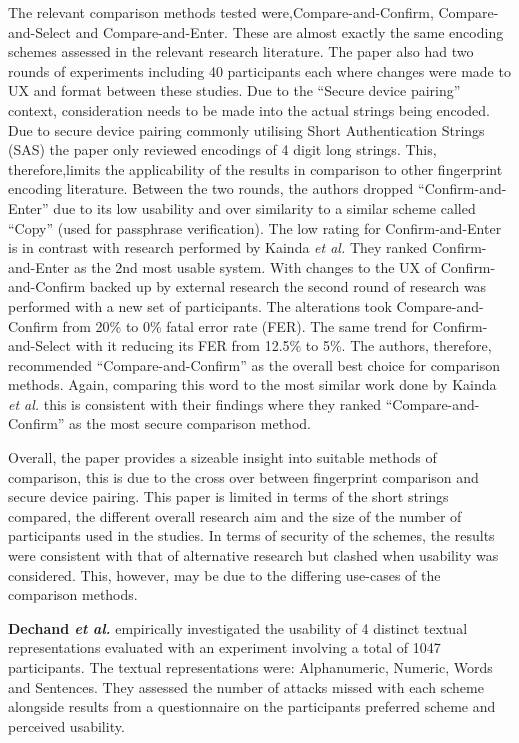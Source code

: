 The relevant comparison methods tested were,Compare-and-Confirm, Compare-and-Select and Compare-and-Enter. These are almost exactly the same encoding schemes assessed in the relevant research literature. The paper also had two rounds of experiments including 40 participants each where changes were made to UX and format between these studies. 
Due to the ``Secure device pairing'' context, consideration needs to be made into the actual strings being encoded. Due to secure device pairing commonly utilising Short Authentication Strings (SAS) the
paper only reviewed encodings of 4 digit long strings. This, therefore,limits the applicability of the results in comparison to other fingerprint encoding literature. Between the two rounds, the authors dropped ``Confirm-and-Enter'' due to its low usability and over similarity to a similar scheme called ``Copy'' (used for passphrase verification). The low rating for Confirm-and-Enter is in contrast with research performed by Kainda \textit{et al.}\cite{kainda2009usability} They ranked Confirm-and-Enter as the 2nd most usable system. With changes to the UX of Confirm-and-Confirm backed up by external research \cite{palmer1990attentional}\cite{hammer2009category} the second round of research was performed with a new set of participants. The alterations took Compare-and-Confirm from 20\% to 0\% fatal error rate (FER). The same trend for Confirm-and-Select with it reducing its FER from 12.5\% to 5\%. The authors, therefore, recommended ``Compare-and-Confirm'' as the overall best choice for comparison methods. Again, comparing this word to the most similar work done by Kainda \textit{et al.}\cite{kainda2009usability} this is consistent with their findings where they ranked ``Compare-and-Confirm'' as the most secure comparison method.

Overall, the paper provides a sizeable insight into suitable methods of comparison, this is due to the cross over between fingerprint comparison and secure device pairing. This paper is limited in terms of the short strings compared, the different overall research aim and the size of the number of participants used in the studies. In terms of security of the schemes, the results were consistent with that of alternative research but clashed when usability was considered. This, however, may be due to the differing use-cases of the comparison methods.

\textbf{Dechand \textit{et al.}}\cite{dechand2016empirical} empirically investigated the usability of 4 distinct textual representations evaluated with an experiment involving a total of 1047 participants. The textual representations were: Alphanumeric, Numeric, Words and Sentences. They assessed the number of attacks missed with each scheme alongside results from a questionnaire on the participants preferred scheme and perceived usability.


